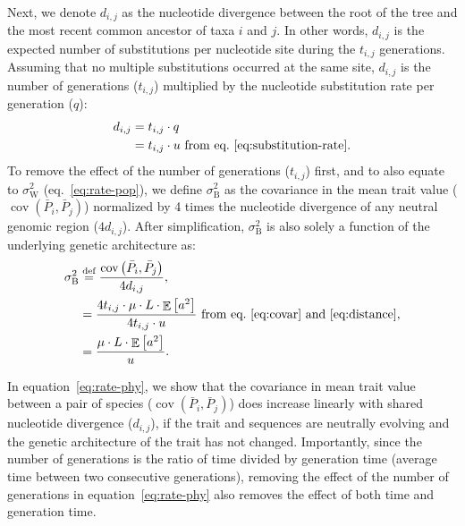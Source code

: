 \documentclass{article}
\newcommand{\defEqual}{\stackrel{\text{def}}{=}}
\newcommand{\Multiply}{\cdot}
\DeclareMathOperator{\E}{\mathbb{E}}
\DeclareMathOperator{\Cov}{\text{cov}}
\newcommand{\Spi}{i}
\newcommand{\Spj}{j}
\newcommand{\NbrGen}{t_{\Spi, \Spj}}
\newcommand{\NucDiv}{d_{\Spi, \Spj}}
\newcommand{\Trait}{P}
\newcommand{\MeanTrait}{\bar{\Trait}}
\newcommand{\VarPhy}{\Cov \left( \MeanTrait_{\Spi}, \MeanTrait_{\Spj}\right)}
\newcommand{\MutationRatePheno}{\mu}
\newcommand{\MutationRateNuc}{u}
\newcommand{\SubRate}{q}
\newcommand{\NbrLoci}{L}
\newcommand{\GenArchi}{\NbrLoci \Multiply \E \left[ a^2 \right]}
\newcommand{\RateBetween}{\sigma^2_{\mathrm{B}}}
\newcommand{\RateWhithin}{\sigma^2_{\mathrm{W}}}
\begin{document}
Next, we denote $\NucDiv$ as the nucleotide divergence between the root of the tree and the most recent common ancestor of taxa $\Spi$ and $\Spj$.
In other words, $\NucDiv$ is the expected number of substitutions per nucleotide site during the $\NbrGen$ generations.
Assuming that no multiple substitutions occurred at the same site, $\NucDiv$ is the number of generations ($\NbrGen$) multiplied by the nucleotide substitution rate per generation ($\SubRate$):
\begin{align}
    \NucDiv & = \NbrGen \Multiply \SubRate \\
    & = \NbrGen \Multiply \MutationRateNuc \text{ from eq.~\ref{eq:substitution-rate}}. \label{eq:distance}
\end{align}
To remove the effect of the number of generations ($\NbrGen$) first, and to also equate to $\RateWhithin$ (eq.~\ref{eq:rate-pop}), we define $\RateBetween$ as the covariance in the mean trait value ($\VarPhy$) normalized by 4 times the nucleotide divergence of any neutral genomic region ($4\NucDiv$).
After simplification, $\RateBetween$ is also solely a function of the underlying genetic architecture as:
\begin{align}
    \RateBetween & \defEqual \frac{\VarPhy}{4 \NucDiv} \label{eq:def-rate-phy},\\
    & = \frac{4 \NbrGen \Multiply \MutationRatePheno \Multiply \GenArchi}{4 \NbrGen \Multiply \MutationRateNuc}\text{ from eq.~\ref{eq:covar} and~\ref{eq:distance}}, \\
    & = \frac{\MutationRatePheno \Multiply \GenArchi}{\MutationRateNuc}. \label{eq:rate-phy}
\end{align}

In equation~\ref{eq:rate-phy}, we show that the covariance in mean trait value between a pair of species ($\VarPhy$) does increase linearly with shared nucleotide divergence ($\NucDiv$), if the trait and sequences are neutrally evolving and the genetic architecture of the trait has not changed.
Importantly, since the number of generations is the ratio of time divided by generation time (average time between two consecutive generations), removing the effect of the number of generations in equation~\ref{eq:rate-phy} also removes the effect of both time and generation time.
\end{document}
